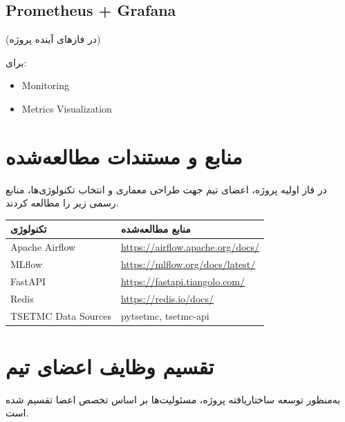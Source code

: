 \documentclass[12pt,a4paper]{article}
\begin{document}
\subsection{Prometheus + Grafana}

(در فازهای آینده پروژه)

برای:

\begin{itemize}
\item Monitoring
\item Metrics Visualization
\end{itemize}


\section{منابع و مستندات مطالعه‌شده}

در فاز اولیه پروژه، اعضای تیم جهت طراحی معماری و انتخاب تکنولوژی‌ها، منابع رسمی زیر را مطالعه کردند.

\begin{longtable}{|p{4cm}|p{9cm}|}

\hline
\textbf{تکنولوژی} & \textbf{منابع مطالعه‌شده} \\
\hline

Apache Airflow &
\url{https://airflow.apache.org/docs/}
\\
\hline

MLflow &
\url{https://mlflow.org/docs/latest/}
\\
\hline

FastAPI &
\url{https://fastapi.tiangolo.com/}
\\
\hline

Redis &
\url{https://redis.io/docs/}
\\
\hline

TSETMC Data Sources &
pytsetmc, tsetmc-api
\\
\hline

\end{longtable}


\section{تقسیم وظایف اعضای تیم}

به‌منظور توسعه ساختاریافته پروژه، مسئولیت‌ها بر اساس تخصص اعضا تقسیم شده است.
\end{document}
